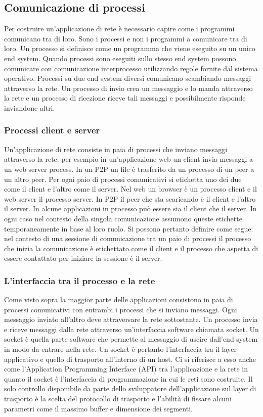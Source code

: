 \subsection{Comunicazione di processi}
Per costruire un'applicazione di rete \`e necessario capire come i programmi comunicano tra di loro. Sono i processi e non i programmi a comunicare tra di loro. Un processo si definisce come un programma che
viene eseguito su un unico end system. Quando processi sono eseguiti sullo stesso end system possono comunicare con comunicazione interprocesso utilizzando regole fornite dal sistema operativo. Processi
su due end system diversi comunicano scambiando messaggi attraverso la rete. Un processo di invio crea un messaggio e lo manda attraverso la rete e un processo di ricezione riceve tali messaggi e 
possibilmente risponde inviandone altri. 
\subsubsection{Processi client e server}
Un'applicazione di rete consiste in paia di processi che inviano messaggi attraverso la rete: per esempio in un'applicazione web un client invia messaggi a un web server process. In un P2P un file \`e trasferito da 
un processo di un peer a un altro peer. Per ogni paio di processi comunicativi si etichetta uno dei due come il client e l'altro come il server. Nel web un browser \`e un processo client e il web server il processo 
server. In P2P il peer che sta scaricando \`e il client e l'altro il server. In alcune applicazioni in processo pu\`o essere sia il client che il server. In ogni caso nel contesto della singola comunicazione assumono 
queste etichette temporaneamente in base al loro ruolo. Si possono pertanto definire come segue: nel contesto di una sessione di comunicazione tra un paio di processi il processo che inizia la comunicazione \`e 
etichettato come il client e il processo che aspetta di essere contattato per iniziare la sessione \`e il server. 
\subsubsection{L'interfaccia tra il processo e la rete}
Come visto sopra la maggior parte delle applicazioni consistono in paia di processi comunicativi con entrambi i processi che si inviano messaggi. Ogni messaggio inviato all'altro deve attraversare la rete 
sottostante. Un processo invia e riceve messaggi dalla rete attraverso un'interfaccia software chiamata socket. Un socket \`e quella parte software che permette al messaggio di uscire dall'end system in modo
da entrare nella rete. Un socket \`e pertanto l'interfaccia tra il layer applicativo e quello di trasporto all'interno di un host. Ci si riferisce a esso anche come l'Application Programming Interface (API) tra 
l'applicazione e la rete in quanto il socket \`e l'interfaccia di programmazione in cui le reti sono costruite. Il solo controllo disponibile da parte dello sviluppatore dell'applicazione sul layer di trasporto \`e la
scelta del protocollo di trasporto e l'abilit\`a di fissare alcuni parametri come il massimo buffer e dimensione dei segmenti. 
